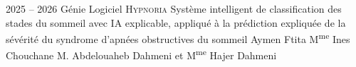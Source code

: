 \documentclass[12pt,a4paper,oneside]{report}
\newcommand{\hypnoria}{\textsc{Hypnoria}}
\begin{document}
\espritPageDeGarde
  {2025 -- 2026}
  {G\'enie Logiciel}
  {\hypnoria{}}
  {Syst\`eme intelligent de classification des stades du sommeil avec IA
   explicable, appliqu\'e \`a la pr\'ediction expliqu\'ee de la s\'ev\'erit\'e du
   syndrome d'apn\'ees obstructives du sommeil}
  {Aymen Ftita}
  {M\textsuperscript{me} Ines Chouchane}
  {M. Abdelouaheb Dahmeni et M\textsuperscript{me} Hajer Dahmeni}

\espritHabillage

\setcounter{page}{2}





\tableofcontents
\clearpage

\listoffigures
\clearpage

\listoftables
\clearpage








\clearpage
{}
{}
\printbibliography[title={Bibliographie}]


\end{document}
